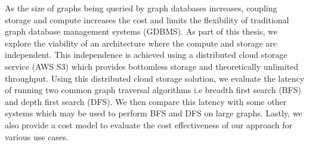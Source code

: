 As the size of graphs being queried by graph databases increases, coupling 
storage and compute increases the cost and limits the flexibility of
traditional graph database management systems (GDBMS). As part of this thesis,
we explore the viability of an architecture where the compute and storage are
independent. This independence is achieved using a distributed cloud storage
service (AWS S3) which provides bottomless storage and theoretically unlimited
throughput. Using this distributed cloud storage solution, we evaluate the
latency of running two common graph traversal algorithms i.e breadth first
search (BFS) and depth first search (DFS). We then compare this latency with
some other systems which may be used to perform BFS and DFS on large graphs.
Lastly, we also provide a cost model to evaluate the cost effectiveness of our
approach for various use cases.
